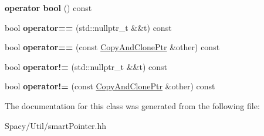 \begin{DoxyCompactItemize}
\item 
\hypertarget{classSpacy_1_1CopyAndClonePtr_ac12179aa60d2299cda0ab9606da5fd60}{}{\bfseries operator bool} () const \label{classSpacy_1_1CopyAndClonePtr_ac12179aa60d2299cda0ab9606da5fd60}

\item 
\hypertarget{classSpacy_1_1CopyAndClonePtr_a4fac7ca230de96073e587d8114dd19cd}{}bool {\bfseries operator==} (std\+::nullptr\+\_\+t \&\&t) const \label{classSpacy_1_1CopyAndClonePtr_a4fac7ca230de96073e587d8114dd19cd}

\item 
\hypertarget{classSpacy_1_1CopyAndClonePtr_aa6fbc7141b160066c8a88317e3c8d43a}{}bool {\bfseries operator==} (const \hyperlink{classSpacy_1_1CopyAndClonePtr}{Copy\+And\+Clone\+Ptr} \&other) const \label{classSpacy_1_1CopyAndClonePtr_aa6fbc7141b160066c8a88317e3c8d43a}

\item 
\hypertarget{classSpacy_1_1CopyAndClonePtr_aa8d1bffcfe682d762adbe5b95f3fd0cd}{}bool {\bfseries operator!=} (std\+::nullptr\+\_\+t \&\&t) const \label{classSpacy_1_1CopyAndClonePtr_aa8d1bffcfe682d762adbe5b95f3fd0cd}

\item 
\hypertarget{classSpacy_1_1CopyAndClonePtr_a5f2b6f61bfa3ef5951120d0fdbc4c717}{}bool {\bfseries operator!=} (const \hyperlink{classSpacy_1_1CopyAndClonePtr}{Copy\+And\+Clone\+Ptr} \&other) const \label{classSpacy_1_1CopyAndClonePtr_a5f2b6f61bfa3ef5951120d0fdbc4c717}

\end{DoxyCompactItemize}


The documentation for this class was generated from the following file\+:\begin{DoxyCompactItemize}
\item 
Spacy/\+Util/smart\+Pointer.\+hh\end{DoxyCompactItemize}
